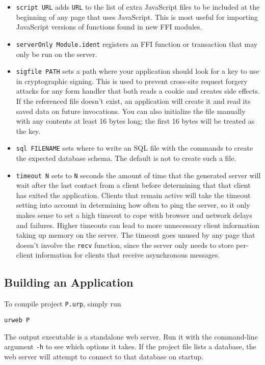 \documentclass{article}
\begin{document}
\begin{itemize}
\item \texttt{script URL} adds \texttt{URL} to the list of extra JavaScript files to be included at the beginning of any page that uses JavaScript.  This is most useful for importing JavaScript versions of functions found in new FFI modules.
\item \texttt{serverOnly Module.ident} registers an FFI function or transaction that may only be run on the server.
\item \texttt{sigfile PATH} sets a path where your application should look for a key to use in cryptographic signing.  This is used to prevent cross-site request forgery attacks for any form handler that both reads a cookie and creates side effects.  If the referenced file doesn't exist, an application will create it and read its saved data on future invocations.  You can also initialize the file manually with any contents at least 16 bytes long; the first 16 bytes will be treated as the key.
\item \texttt{sql FILENAME} sets where to write an SQL file with the commands to create the expected database schema.  The default is not to create such a file.
\item \texttt{timeout N} sets to \texttt{N} seconds the amount of time that the generated server will wait after the last contact from a client before determining that that client has exited the application.  Clients that remain active will take the timeout setting into account in determining how often to ping the server, so it only makes sense to set a high timeout to cope with browser and network delays and failures.  Higher timeouts can lead to more unnecessary client information taking up memory on the server.  The timeout goes unused by any page that doesn't involve the \texttt{recv} function, since the server only needs to store per-client information for clients that receive asynchronous messages.
\end{itemize}


\subsection{Building an Application}

To compile project \texttt{P.urp}, simply run
\begin{verbatim}
urweb P
\end{verbatim}
The output executable is a standalone web server.  Run it with the command-line argument \texttt{-h} to see which options it takes.  If the project file lists a database, the web server will attempt to connect to that database on startup.
\end{document}
